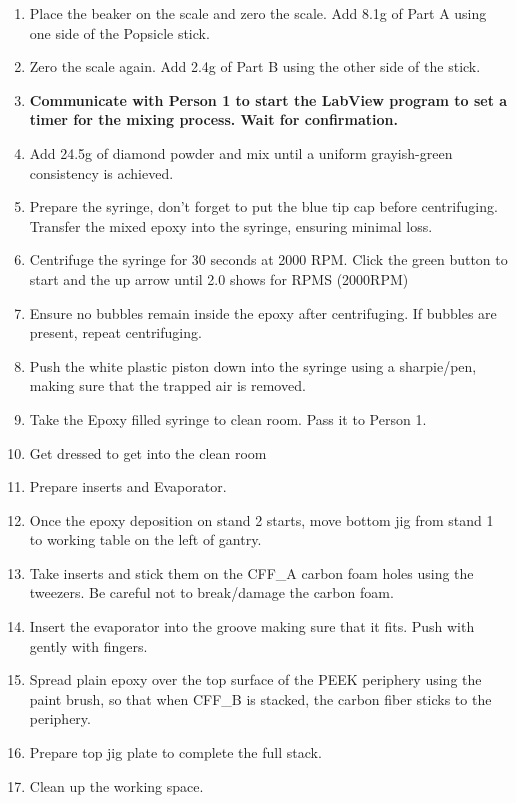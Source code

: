 \documentclass[12pt]{cornelltfpxsop}
\begin{document}
\begin{paracol}{2}
\begin{enumerate}
        \item Place the beaker on the scale and zero the scale. Add 8.1g of Part A using one side of the Popsicle stick.
        \item Zero the scale again. Add 2.4g of Part B using the other side of the stick.
        \item \textbf{Communicate with Person 1 to start the LabView program to set a timer for the mixing process. Wait for confirmation.}       
        \item Add 24.5g of diamond powder and mix until a uniform grayish-green\\ consistency is achieved.
        \item Prepare the syringe, don't forget to put the blue tip cap before centrifuging. Transfer the mixed epoxy into the syringe, ensuring minimal loss.
        \item Centrifuge the syringe for 30 seconds at 2000 RPM. Click the green button to start and the up arrow until 2.0 shows for RPMS (2000RPM)
        \item Ensure no bubbles remain inside the epoxy after centrifuging. If bubbles are present, repeat centrifuging. 
        \item Push the white plastic piston down into the syringe using a sharpie/pen, making sure that the trapped air is removed. 
        \item Take the Epoxy filled syringe to clean room. Pass it to Person 1.
        \item Get dressed to get into the clean room   
        \item Prepare inserts and Evaporator.
        \item Once the epoxy deposition on stand 2 starts, move bottom jig from stand 1 to working table on the left of gantry. 
        \item Take inserts and stick them on the  CFF\_A carbon foam holes using the tweezers. Be careful not to break/damage the carbon foam.
        \item Insert the evaporator into the groove making sure that it fits. Push with gently with fingers.
        \item Spread plain epoxy over the top surface of the PEEK periphery using the paint brush, so that when CFF\_B is stacked, the carbon fiber sticks to the periphery.  
        \item Prepare top jig plate to complete the full stack.
        \item Clean up the working space.
\switchcolumn %
\end{enumerate}
\end{paracol}
\end{document}
